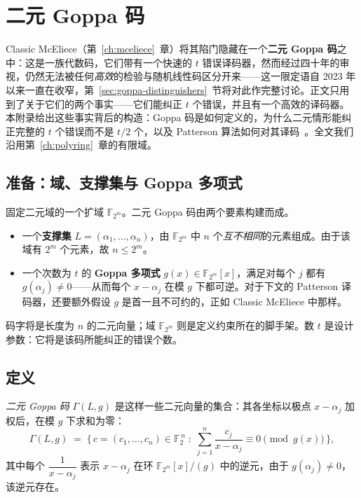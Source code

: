 \chapter{二元 Goppa 码}
\label{app:goppa}

Classic McEliece（第~\ref{ch:mceliece}~章）将其陷门隐藏在一个\textbf{二元 Goppa 码}之中：这是一族代数码，它们带有一个快速的 $t$ 错误译码器，然而经过四十年的审视，仍然无法被任何\emph{高效}的检验与随机线性码区分开来——这一限定语自 2023 年以来一直在收窄，第~\ref{sec:goppa-distinguishers}~节将对此作完整讨论。正文只用到了关于它们的两个事实——它们能纠正 $t$ 个错误，并且有一个高效的译码器。本附录给出这些事实背后的构造：Goppa 码是如何定义的，为什么二元情形能纠正完整的 $t$ 个错误而不是 $t/2$ 个，以及 Patterson 算法如何对其译码~\cite{goppa1970,patterson1975}。全文我们沿用第~\ref{ch:polyring}~章的有限域。

\section{准备：域、支撑集与 Goppa 多项式}

固定二元域的一个扩域 $\mathbb{F}_{2^m}$。二元 Goppa 码由两个要素构建而成。

\begin{itemize}
  \item 一个\textbf{支撑集} $L = (\alpha_1,\dots,\alpha_n)$，由 $\mathbb{F}_{2^m}$ 中 $n$ 个\emph{互不相同}的元素组成。由于该域有 $2^m$ 个元素，故 $n \le 2^m$。
  \item 一个次数为 $t$ 的 \textbf{Goppa 多项式} $g(x) \in \mathbb{F}_{2^m}[x]$，满足对每个 $j$ 都有 $g(\alpha_j) \neq 0$——从而每个 $x-\alpha_j$ 在模 $g$ 下都可逆。对于下文的 Patterson 译码器，还要额外假设 $g$ 是首一且不可约的，正如 Classic McEliece 中那样。
\end{itemize}

码字将是长度为 $n$ 的二元向量；域 $\mathbb{F}_{2^m}$ 则是定义约束所在的脚手架。数 $t$ 是设计参数：它将是该码所能纠正的错误个数。

\section{定义}

\begin{definition}[二元 Goppa 码]
\emph{二元 Goppa 码} $\Gamma(L,g)$ 是这样一些二元向量的集合：其各坐标以极点 $x-\alpha_j$ 加权后，在模 $g$ 下求和为零：
\[
\Gamma(L,g) \;=\; \Big\{\, c=(c_1,\dots,c_n)\in\mathbb{F}_2^{\,n} \;:\; \sum_{j=1}^{n} \frac{c_j}{x-\alpha_j} \equiv 0 \pmod{g(x)} \,\Big\},
\]
其中每个 $\dfrac{1}{x-\alpha_j}$ 表示 $x-\alpha_j$ 在环 $\mathbb{F}_{2^m}[x]/(g)$ 中的逆元，由于 $g(\alpha_j)\neq 0$，该逆元存在。
\end{definition}

